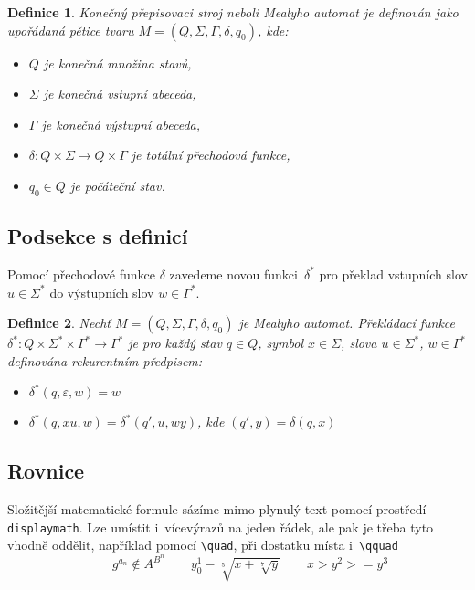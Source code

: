 \documentclass[11pt,a4paper,twocolumn]{article}
\newtheorem{definition}{Definice}
\begin{document}
\begin{definition}
    {\upshape Konečný přepisovaci stroj} neboli {\upshape Mealyho automat} je definován jako upořádaná pětice tvaru ${M = (Q, \mathit{\varSigma}, \mathit{\varGamma}, \delta, q_0)}$, kde:
    \begin{itemize}
        \item $Q$ je konečná množina \textup{stavů},
        \item $\mathit{\varSigma}$ je konečná \textup{vstupní abeceda},
        \item $\mathit{\varGamma}$ je konečná \textup{výstupní abeceda},
        \item $\delta:Q \times \mathit{\varSigma} \rightarrow Q \times \mathit{\varGamma}$ je totální \textup{přechodová funkce},
        \item $q_0\in Q$ je \textup{počáteční stav}.
    \end{itemize}
\end{definition}
\subsection{Podsekce s definicí}
Pomocí přechodové funkce $\delta$ zavedeme novou funkci~$\delta^*$ pro překlad vstupních slov $u \in \varSigma^*$ do výstupních slov $w \in \varGamma^*$.

\begin{definition}
    Nechť $M = (Q, \mathit{\varSigma}, \mathit{\varGamma}, \delta, q_0)$ je Mealyho automat. \textup{Překládací funkce} $\delta^*:Q \times \mathit{\varSigma}^* \times \mathit{\varGamma}^* \rightarrow \mathit{\varGamma}^*$ je pro každý stav $q \in Q$, symbol $x \in \mathit{\varSigma}$, slova $u \in \mathit{\varSigma}^*$, $w \in \mathit{\varGamma}^*$ definována rekurentním předpisem:
    \begin{itemize}
        \item $\delta^*(q,\varepsilon, w) = w$
        \item $\delta^*(q, xu, w) = \delta^*(q', u, w y)$, kde $(q', y) = \delta(q,x)$
    \end{itemize}
\end{definition}

\subsection{Rovnice}
Složitější matematické formule sázíme mimo plynulý text pomocí prostředí \texttt{displaymath}. Lze umístit i~vícevýrazů na jeden řádek, ale pak je třeba tyto vhodně oddělit, například pomocí \texttt{\textbackslash quad}, při dostatku místa i~\texttt{\textbackslash qquad}
\begin{displaymath}
    \qquad g^{a_{n}} \notin A^{B^{n}}
    \qquad y^1_0- \sqrt[5]{x+\sqrt[7]{y}}
    \qquad x>y^2>=y^3
\end{displaymath}
\end{document}
